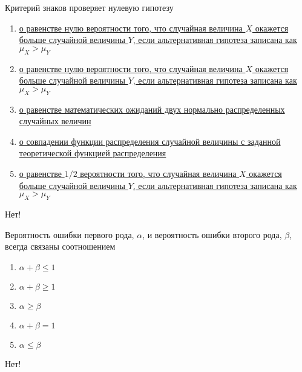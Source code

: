 \documentclass[t]{beamer}
\begin{document}
 \begin{frame} \label{57-No} 
\begin{block}{57} 

Критерий знаков проверяет нулевую гипотезу
 


 \end{block} 
\begin{enumerate} 
\item[] \hyperlink{57-Yes}{\beamergotobutton{} о равенстве нулю вероятности того, что случайная величина $X$ окажется больше случайной величины $Y$, если альтернативная гипотеза записана как $\mu_X>\mu_Y$}
\item[] \hyperlink{57-No}{\beamergotobutton{} о равенстве нулю вероятности того, что случайная величина $X$ окажется больше случайной величины $Y$, если альтернативная гипотеза записана как $\mu_X>\mu_Y$ }
\item[] \hyperlink{57-No}{\beamergotobutton{} о равенстве математических ожиданий двух нормально распределенных случайных величин}
\item[] \hyperlink{57-No}{\beamergotobutton{} о совпадении функции распределения случайной величины с заданной теоретической функцией распределения}
\item[] \hyperlink{57-No}{\beamergotobutton{} о равенстве $1/2$ вероятности того, что случайная величина $X$ окажется больше случайной величины $Y$, если альтернативная гипотеза записана как $\mu_X>\mu_Y$}
\end{enumerate} 

 \alert{Нет!} 
\end{frame} 


 \begin{frame} \label{58-No} 
\begin{block}{58} 

Вероятность ошибки первого рода, $\alpha$, и вероятность ошибки второго рода, $\beta$, всегда связаны соотношением


 \end{block} 
\begin{enumerate} 
\item[] \hyperlink{58-No}{\beamergotobutton{} $\alpha+\beta \leq 1$}
\item[] \hyperlink{58-No}{\beamergotobutton{} $\alpha+\beta \geq 1$}
\item[] \hyperlink{58-No}{\beamergotobutton{} $\alpha\geq \beta $}
\item[] \hyperlink{58-No}{\beamergotobutton{} $\alpha+\beta=1$}
\item[] \hyperlink{58-No}{\beamergotobutton{} $\alpha\leq \beta $}
\end{enumerate} 

 \alert{Нет!} 
\end{frame} 
\end{document}
